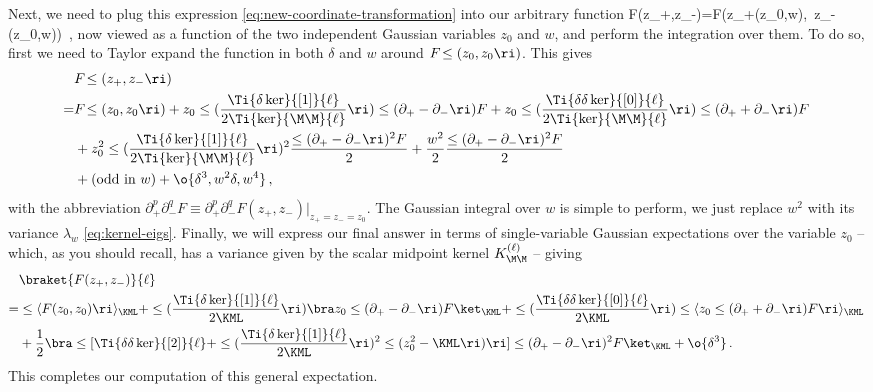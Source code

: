 Next, we need to plug this expression \eqref{eq:new-coordinate-transformation} into our arbitrary function 
\be\label{eq:function-in-new-coordinate}
F\!\le(z_{+},z_{-}\ri)=F\Big(z_{+}\!\le(z_0,w\ri)\!,~z_{-}\!\le(z_0,w\ri)\Big)\, ,
\ee
now viewed as a function of the two independent Gaussian variables $z_0$ and $w$, and perform the integration over them.
To do so, first we need to Taylor expand the function in both $\delta$ and $w$ around $F\!\le(z_0,z_0\ri)$.
 This gives
\begin{align}\label{eq:expectation-of-general-F}
&F\!\le(z_{+},z_{-}\ri)\, \\
=&F\!\le(z_0, z_0\ri) +z_0 \le(\frac{\Ti{\delta\ker}{[1]}{\ell}}{2\Ti{\ker}{\M\M}{\ell} }\ri)\le(\partial_{+}-\partial_{-}\ri) F+ z_0\le(\frac{\Ti{\delta\delta\ker}{[0]}{\ell}}{2\Ti{\ker}{\M\M}{\ell} }\ri)\le(\partial_{+}+\partial_{-}\ri) F\, \nonumber\\
&+z_0^2\le(\frac{\Ti{\delta\ker}{[1]}{\ell}}{2\Ti{\ker}{\M\M}{\ell}}\ri)^2\frac{\le(\partial_{+}-\partial_{-}\ri)^2 F}{2}+\frac{w^2}{2}\frac{\le(\partial_{+}-\partial_{-}\ri)^2 F}{2}\, \nonumber\\
&+(\text{odd in }w)+\o{\delta^3, w^2 \delta, w^4}\, ,\nonumber
\end{align}
with the abbreviation $\partial_{+}^p\partial_{-}^qF\equiv\partial_{+}^p\partial_{-}^q F(z_{+},z_{-}) \vert_{z_{+}=z_{-}=z_0}$.
The Gaussian integral over $w$ is simple to perform, we just replace $w^2$ with its variance $\lambda_w$ \eqref{eq:kernel-eigs}. Finally, we will express our final answer in terms of single-variable Gaussian expectations over the variable $z_0$ -- which, as you should recall, has a variance given by the scalar midpoint kernel $K_{\M\M}^{(\ell)}$ -- giving
\begin{align}\label{eq:F-expectaiton-final}
&\braket{F(z_{+},z_{-})}{\ell}\, \\
=&\le\langle F(z_0,z_0)\ri\rangle_{\KML}+\le(\frac{\Ti{\delta\ker}{[1]}{\ell}}{2\KML}\ri)\bra z_0 \le(\partial_{+}-\partial_{-}\ri)F\ket_{\KML}+\le(\frac{\Ti{\delta\delta\ker}{[0]}{\ell}}{2\KML}\ri)\le\langle z_0 \le(\partial_{+}+\partial_{-}\ri)F\ri\rangle_{\KML}\, \nonumber\\
&+\frac{1}{2}\bra \le[\Ti{\delta\delta\ker}{[2]}{\ell}+\le(\frac{\Ti{\delta \ker}{[1]}{\ell}}{2\KML}\ri)^2\le(z_0^2-\KML\ri)\ri] \le(\partial_{+}-\partial_{-}\ri)^2F\ket_{\KML}+\o{\delta^3}\, .\nonumber
\end{align}
This completes our computation of this general expectation.

